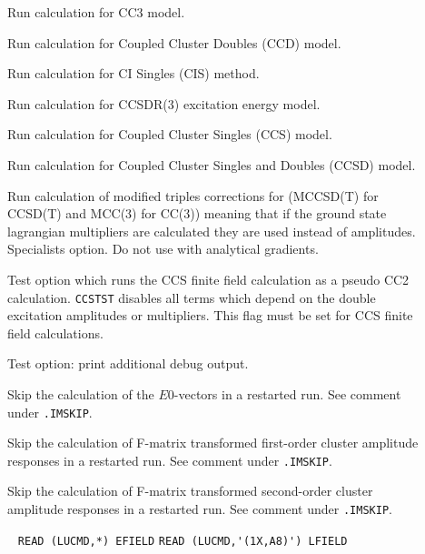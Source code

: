 \begin{description}
\item[]     
        Run calculation for CC3 model.
%
\item[]    
        Run calculation for Coupled Cluster Doubles
        (CCD) model. 
%
\item[]    
        Run calculation for CI Singles (CIS) method. 
%
\item[] 
        Run calculation for CCSDR(3) excitation energy model.
%
\item[] 
        Run calculation for Coupled Cluster Singles
        (CCS) model. 
%
\item[]   
        Run calculation for Coupled Cluster Singles and Doubles
        (CCSD) model. 
%
%
\item[]   
        Run calculation of modified triples corrections for (MCCSD(T) for CCSD(T) and MCC(3) for CC(3))
        meaning that if the ground state lagrangian multipliers are calculated 
        they are used instead of amplitudes. Specialists option. 
        Do not use with analytical gradients. 
%
\item[] 
   Test option which runs the CCS finite field calculation as a pseudo CC2
   calculation. \verb+CCSTST+ disables all terms which depend on the
   double excitation amplitudes or multipliers. This flag must be
   set for CCS finite field calculations.
%
\item[]  
   Test option: print additional debug output.
%
\item[] 
   Skip the calculation of the $E0$-vectors 
   in a restarted run. See comment under \verb|.IMSKIP|.
%
\item[] 
   Skip the calculation of F-matrix transformed first-order
   cluster amplitude responses in a restarted run. See comment under \verb|.IMSKIP|.
%
\item[] 
   Skip the calculation of F-matrix transformed second-order
   cluster amplitude responses in a restarted run. See comment under \verb|.IMSKIP|.
%
\item[] \verb| |\newline
    \verb|READ (LUCMD,*) EFIELD|\newline
    \verb|READ (LUCMD,'(1X,A8)') LFIELD|


\end{description}
